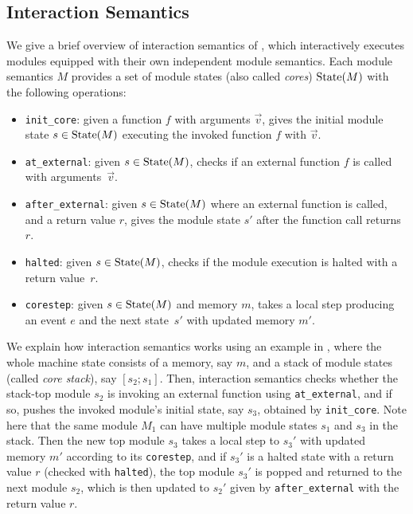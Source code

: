 \subsection{Interaction Semantics}
\label{sec:compiler:background:isem}

We give a brief overview of interaction semantics of \ccc{}, which
interactively executes modules equipped with their own independent
module semantics. Each module semantics $M$ provides
a set of module states (also called \emph{cores}) $\textrm{State}(M)$ with the following operations:
\begin{itemize}
\item \texttt{init\_core}: given a function $f$ with arguments $\vec{v}$,
  gives the initial module state $s \in \textrm{State}(M)$
  executing the invoked function $f$ with $\vec{v}$.
\item \texttt{at\_external}: given $s \in \textrm{State}(M)$,
  checks if an external function $f$ is called with arguments~$\vec{v}$.
\item \texttt{after\_external}: given $s \in \textrm{State}(M)$
  where an external function is called,
  and a return value $r$,
  gives the module state $s'$
  after the function call returns $r$.
\item \texttt{halted}: given $s \in \textrm{State}(M)$, checks if the module execution is halted with a return value~$r$.
\item \texttt{corestep}: given $s \in \textrm{State}(M)$ and memory $m$, takes a local step producing an event $e$ and the next state~$s'$ with updated memory $m'$.
\end{itemize}

We explain how interaction semantics works using an example in
, where the whole machine state consists of a
memory, say $m$, and a stack of module states (called \emph{core stack}), say $[s_2; s_1]$.
Then, interaction semantics checks whether the stack-top module $s_2$
is invoking an external function using \texttt{at\_external}, and if
so, pushes the invoked module's initial state, say $s_3$, obtained by
\texttt{init\_core}. Note here that the same module $M_1$ can have
multiple module states $s_1$ and $s_3$ in the stack.  Then the
new top module $s_3$ takes a local step to $s_3'$ with updated memory
$m'$ according to its \texttt{corestep}, and if $s_3'$ is a halted
state with a return value $r$ (checked with \texttt{halted}), the top
module $s_3'$ is popped and returned to the next module $s_2$, which
is then updated to $s_2'$ given by \texttt{after\_external} with the return
value $r$.

